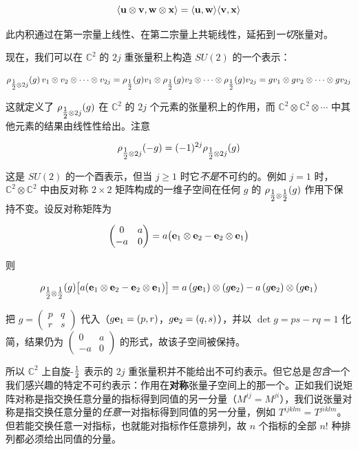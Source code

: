 \[
\langle\mathbf{u}\otimes\mathbf{v},\mathbf{w}\otimes\mathbf{x}\rangle=\langle\mathbf{u},\mathbf{w}\rangle\langle\mathbf{v},\mathbf{x}\rangle
\]

此内积通过在第一宗量上线性、在第二宗量上共轭线性，延拓到\emph{一切}张量对。

现在，我们可以在 $\mathbb{C}^{2}$ 的 $2j$ 重张量积上构造 $SU(2)$ 的一个表示：

\[
\rho_{\tfrac{1}{2}\otimes 2j}(g)\,v_{1}\otimes v_{2}\otimes\cdots\otimes v_{2j}
=\rho_{\tfrac{1}{2}}(g)v_{1}\otimes\rho_{\tfrac{1}{2}}(g)v_{2}\otimes\cdots\otimes\rho_{\tfrac{1}{2}}(g)v_{2j}
=gv_{1}\otimes gv_{2}\otimes\cdots\otimes gv_{2j}
\]

这就定义了 $\rho_{\tfrac{1}{2}\otimes 2j}(g)$ 在 $\mathbb{C}^{2}$ 的 $2j$ 个元素的张量积上的作用，而 $\mathbb{C}^{2}\otimes\mathbb{C}^{2}\otimes\cdots$ 中其他元素的结果由线性性给出。注意

\[
\rho_{\tfrac{1}{2}\otimes 2j}(-g)=(-1)^{2j}\rho_{\tfrac{1}{2}\otimes 2j}(g)
\]

这是 $SU(2)$ 的一个酉表示，但当 $j\ge 1$ 时它\emph{不是}不可约的。例如 $j=1$ 时，$\mathbb{C}^{2}\otimes\mathbb{C}^{2}$ 中由反对称 $2\times2$ 矩阵构成的一维子空间在任何 $g$ 的 $\rho_{\tfrac{1}{2}\otimes\tfrac{1}{2}}(g)$ 作用下保持不变。设反对称矩阵为

\[
\begin{pmatrix}0 & a\\ -a & 0\end{pmatrix}=a\bigl(\mathbf{e}_{1}\otimes\mathbf{e}_{2}-\mathbf{e}_{2}\otimes\mathbf{e}_{1}\bigr)
\]

则

\[
\rho_{\tfrac{1}{2}\otimes\tfrac{1}{2}}(g)\bigl[a(\mathbf{e}_{1}\otimes\mathbf{e}_{2}-\mathbf{e}_{2}\otimes\mathbf{e}_{1})\bigr]
=a\,(g\mathbf{e}_{1})\otimes(g\mathbf{e}_{2})-a\,(g\mathbf{e}_{2})\otimes(g\mathbf{e}_{1})
\]

把 $g=\begin{pmatrix}p & q\\ r & s\end{pmatrix}$ 代入（$g\mathbf{e}_{1}=(p,r)$，$g\mathbf{e}_{2}=(q,s)$），并以 $\det g=ps-rq=1$ 化简，结果仍为 $\begin{pmatrix}0 & a\\ -a & 0\end{pmatrix}$ 的形式，故该子空间被保持。

所以 $\mathbb{C}^{2}$ 上自旋-$\tfrac{1}{2}$ 表示的 $2j$ 重张量积并不能给出不可约表示。但它总是\emph{包含}一个我们感兴趣的特定不可约表示：作用在\textbf{对称}张量子空间上的那一个。正如我们说矩阵对称是指交换任意分量的指标得到同值的另一分量（$M^{ij}=M^{ji}$），我们说张量对称是指交换任意分量的\emph{任意}一对指标得到同值的另一分量，例如 $T^{ijklm}=T^{jiklm}$。但若能交换任意一对指标，也就能对指标作任意排列，故 $n$ 个指标的全部 $n!$ 种排列都必须给出同值的分量。

